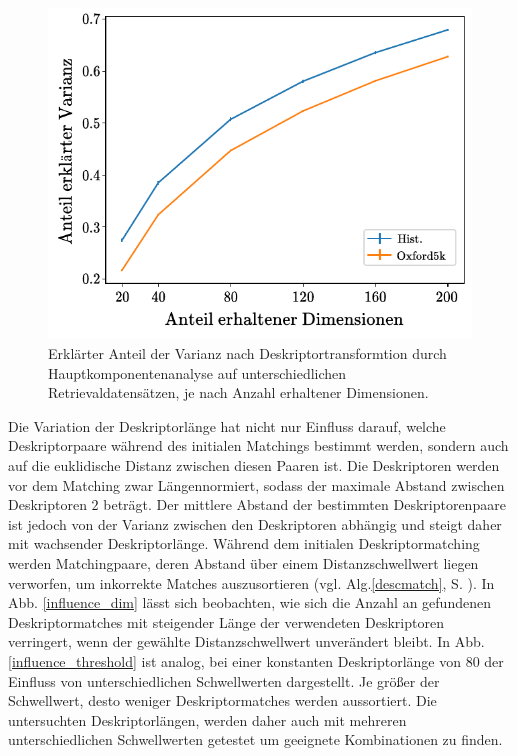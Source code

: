 \begin{figure}[h]
\centering
\includegraphics[scale=1]{explained_variance.pdf}
\caption{Erklärter Anteil der Varianz nach Deskriptortransformtion durch Hauptkomponentenanalyse auf unterschiedlichen Retrievaldatensätzen, je nach Anzahl erhaltener Dimensionen.}
\label{explained_variance_ratio}
\end{figure}
Die Variation der Deskriptorlänge hat nicht nur Einfluss darauf, welche Deskriptorpaare während des initialen Matchings bestimmt werden, sondern auch auf die euklidische Distanz zwischen diesen Paaren ist. Die Deskriptoren werden vor dem Matching zwar Längennormiert, sodass der maximale Abstand zwischen Deskriptoren $2$ beträgt. Der mittlere Abstand der bestimmten Deskriptorenpaare ist jedoch von der Varianz zwischen den Deskriptoren abhängig und steigt daher mit wachsender Deskriptorlänge. Während dem initialen Deskriptormatching werden Matchingpaare, deren Abstand über einem Distanzschwellwert liegen verworfen, um inkorrekte Matches auszusortieren (vgl. Alg.\ref{descmatch}, S. \pageref{descmatch}). In Abb. \ref{influence_dim} lässt sich beobachten, wie sich die Anzahl an gefundenen Deskriptormatches mit steigender Länge der verwendeten Deskriptoren verringert, wenn der gewählte Distanzschwellwert unverändert bleibt. In Abb. \ref{influence_threshold} ist analog, bei einer konstanten Deskriptorlänge von $80$ der Einfluss von unterschiedlichen Schwellwerten dargestellt. Je größer der Schwellwert, desto weniger Deskriptormatches werden aussortiert. Die untersuchten Deskriptorlängen, werden daher auch mit mehreren unterschiedlichen Schwellwerten getestet um geeignete Kombinationen zu finden. 

